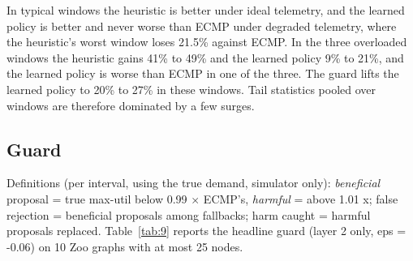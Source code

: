 \documentclass[journal]{IEEEtran}
\begin{document}
In typical windows the heuristic is better under ideal telemetry, and the learned policy is better and never worse than ECMP under degraded telemetry, where the heuristic's worst window loses 21.5\% against ECMP. In the three overloaded windows the heuristic gains 41\% to 49\% and the learned policy 9\% to 21\%, and the learned policy is worse than ECMP in one of the three. The guard lifts the learned policy to 20\% to 27\% in these windows. Tail statistics pooled over windows are therefore dominated by a few surges.

\subsection{Guard}
\label{sec:6.5}
Definitions (per interval, using the true demand, simulator only): \textit{beneficial} proposal = true max-util below 0.99 $\times$ ECMP's, \textit{harmful} = above 1.01 x; false rejection = beneficial proposals among fallbacks; harm caught = harmful proposals replaced. Table~\ref{tab:9} reports the headline guard (layer 2 only, eps = -0.06) on 10 Zoo graphs with at most 25 nodes.

\begin{table}[!t]
\caption{Guard behaviour on 10 Zoo graphs. Fallback is the share of intervals replaced by ECMP; false rejection is the share of fallbacks where the proposal was beneficial; harm caught is the share of harmful proposals replaced; gain kept compares the guarded with the unguarded gain.}
\label{tab:9}
\centering
\scriptsize
\renewcommand{\arraystretch}{1.05}
\end{table}
\end{document}
